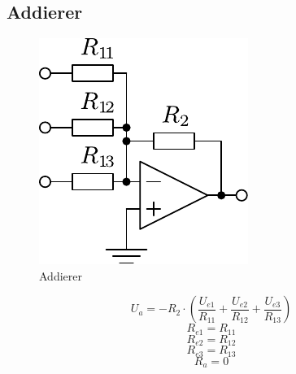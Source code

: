 



\subsection{Addierer}
\begin{figure}[h!]
	\centering
	\includegraphics[scale=\schscale]{op_add.pdf}
	\caption{Addierer}
	\label{sch:op-add}
\end{figure}
\[ U_a = - R_2 \cdot \left( \frac{U_{e1}}{R_{11}} + \frac{U_{e2}}{R_{12}} 
+ \frac{U_{e3}}{R_{13}} \right) \]
\[ R_{e1} = R_{11} \]
\[ R_{e2} = R_{12} \]
\[ R_{e3} = R_{13} \]
\[ R_a = 0 \]